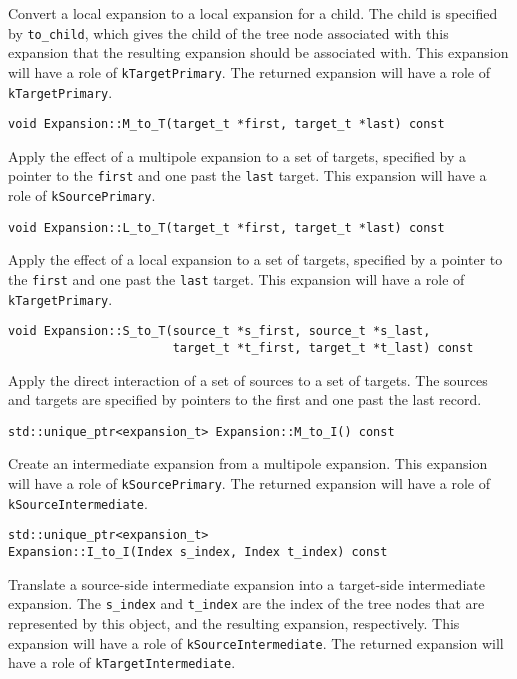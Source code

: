 \noindent Convert a local expansion to a local expansion for a child. The
child is specified by \texttt{to\_child}, which gives the child of the tree
node associated with this expansion that the resulting expansion should be
associated with.
This expansion will have a role of \texttt{kTargetPrimary}.
The returned expansion will have a role of \texttt{kTargetPrimary}.

\begin{lstlisting}
void Expansion::M_to_T(target_t *first, target_t *last) const
\end{lstlisting}

\noindent Apply the effect of a multipole expansion to a set of targets,
specified by a pointer to the \texttt{first} and one past the \texttt{last}
target.
This expansion will have a role of \texttt{kSourcePrimary}.

\begin{lstlisting}
void Expansion::L_to_T(target_t *first, target_t *last) const
\end{lstlisting}

\noindent Apply the effect of a local expansion to a set of targets, specified
by a pointer to the \texttt{first} and one past the \texttt{last} target.
This expansion will have a role of \texttt{kTargetPrimary}.

\begin{lstlisting}
void Expansion::S_to_T(source_t *s_first, source_t *s_last,
                       target_t *t_first, target_t *t_last) const
\end{lstlisting}

\noindent Apply the direct interaction of a set of sources to a set of targets.
The sources and targets are specified by pointers to the first and one past the
last record.

\begin{lstlisting}
std::unique_ptr<expansion_t> Expansion::M_to_I() const
\end{lstlisting}

\noindent Create an intermediate expansion from a multipole expansion.
This expansion will have a role of \texttt{kSourcePrimary}.
The returned expansion will have a role of \texttt{kSourceIntermediate}.

\begin{lstlisting}
std::unique_ptr<expansion_t>
Expansion::I_to_I(Index s_index, Index t_index) const
\end{lstlisting}

\noindent Translate a source-side intermediate expansion into a target-side
intermediate expansion. The \texttt{s\_index} and \texttt{t\_index} are the
index of the tree nodes that are represented by this object, and the
resulting expansion, respectively.
This expansion will have a role of \texttt{kSourceIntermediate}.
The returned expansion will have a role of \texttt{kTargetIntermediate}.

